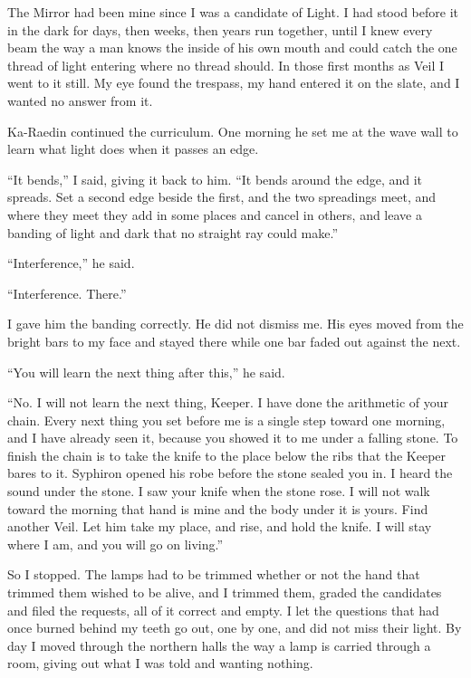The Mirror had been mine since I was a candidate of Light. I had stood before it in the dark for days, then weeks, then years run together, until I knew every beam the way a man knows the inside of his own mouth and could catch the one thread of light entering where no thread should. In those first months as Veil I went to it still. My eye found the trespass, my hand entered it on the slate, and I wanted no answer from it.\par

Ka-Raedin continued the curriculum. One morning he set me at the wave wall to learn what light does when it passes an edge.\par

``It bends,'' I said, giving it back to him. ``It bends around the edge, and it spreads. Set a second edge beside the first, and the two spreadings meet, and where they meet they add in some places and cancel in others, and leave a banding of light and dark that no straight ray could make.''\par

``Interference,'' he said.\par
``Interference. There.''\par

I gave him the banding correctly. He did not dismiss me. His eyes moved from the bright bars to my face and stayed there while one bar faded out against the next.\par

``You will learn the next thing after this,'' he said.\par
``No. I will not learn the next thing, Keeper. I have done the arithmetic of your chain. Every next thing you set before me is a single step toward one morning, and I have already seen it, because you showed it to me under a falling stone. To finish the chain is to take the knife to the place below the ribs that the Keeper bares to it. Syphiron opened his robe before the stone sealed you in. I heard the sound under the stone. I saw your knife when the stone rose. I will not walk toward the morning that hand is mine and the body under it is yours. Find another Veil. Let him take my place, and rise, and hold the knife. I will stay where I am, and you will go on living.''\par

So I stopped. The lamps had to be trimmed whether or not the hand that trimmed them wished to be alive, and I trimmed them, graded the candidates and filed the requests, all of it correct and empty. I let the questions that had once burned behind my teeth go out, one by one, and did not miss their light. By day I moved through the northern halls the way a lamp is carried through a room, giving out what I was told and wanting nothing. \par

